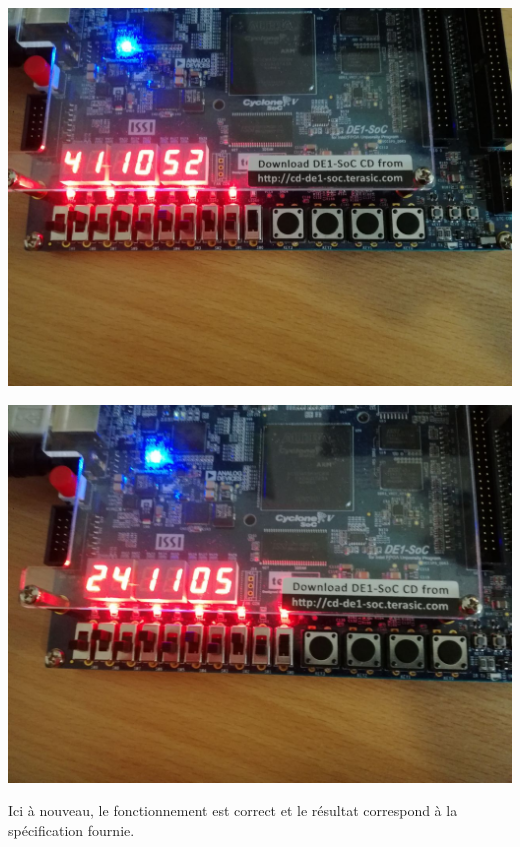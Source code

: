 \includegraphics[scale=0.3]{./images/testp5.jpeg}

\includegraphics[scale=0.3]{./images/testp6.jpeg}

Ici à nouveau, le fonctionnement est correct et le résultat correspond à la spécification fournie.